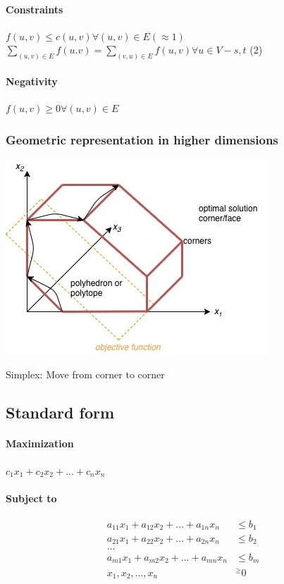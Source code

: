 \paragraph{Constraints} $f(u,v) \leq c(u,v) \forall (u,v) \in E (\approx 1)$ \\
$\sum_{(u,v) \in E}f(u.v) = \sum_{(v,u) \in E}f(u,v) \forall u \in V-{s,t}$ (2)
\paragraph{Negativity} $f(u,v) \geq 0 \forall (u,v) \in E$ 

\subsubsection{Geometric representation in higher dimensions}
\begin{center}
	\includegraphics[scale=0.5]{img/dia2}
\end{center}
Simplex: Move from corner to corner

\subsection{Standard form}
\paragraph{Maximization} $c_1x_1 + c_2x_2 + ... + c_nx_n$
\paragraph{Subject to} \begin{align*}
	a_{11}x_1 + a_{12}x_2  + ... + a_{1n}x_n  &\leq b_1 \\
	a_{21}x_1 + a_{22}x_2  + ... + a_{2n}x_n  &\leq b_2 \\
	... \\
	a_{m1}x_1 + a_{m2}x_2  + ... + a_{mn}x_n  &\leq b_m \\
	x_1,x_2,...,x_n  &^\geq 0 \\
\end{align*}
